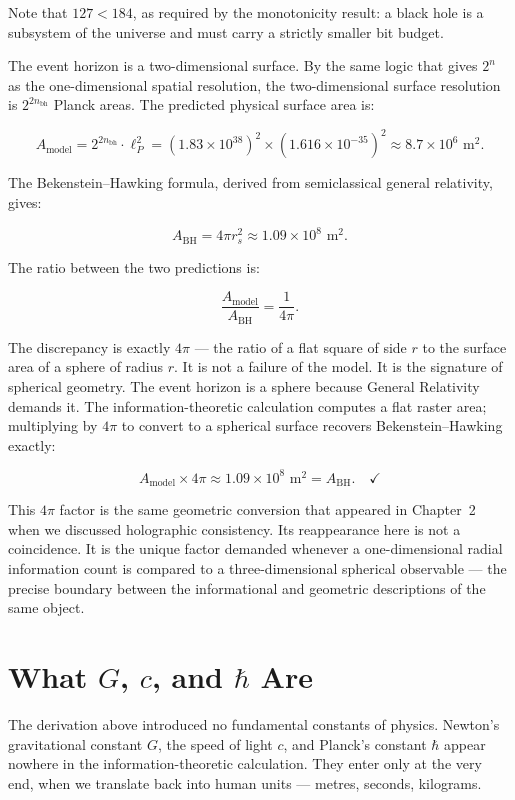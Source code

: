 Note that $127 < 184$, as required by the monotonicity result: a black hole
is a subsystem of the universe and must carry a strictly smaller bit budget.

The event horizon is a two-dimensional surface. By the same logic that gives
$2^n$ as the one-dimensional spatial resolution, the two-dimensional surface
resolution is $2^{2n_{\mathrm{bh}}}$ Planck areas. The predicted physical
surface area is:

\[
A_{\mathrm{model}} = 2^{2n_{\mathrm{bh}}} \cdot \ell_P^2
= (1.83 \times 10^{38})^2 \times (1.616 \times 10^{-35})^2
\approx 8.7 \times 10^6 \text{ m}^2.
\]

The Bekenstein--Hawking formula, derived from semiclassical general
relativity, gives:

\[
A_{\mathrm{BH}} = 4\pi r_s^2 \approx 1.09 \times 10^8 \text{ m}^2.
\]

The ratio between the two predictions is:

\[
\frac{A_{\mathrm{model}}}{A_{\mathrm{BH}}} = \frac{1}{4\pi}.
\]

The discrepancy is exactly $4\pi$ --- the ratio of a flat square of side $r$
to the surface area of a sphere of radius $r$. It is not a failure of the
model. It is the signature of spherical geometry. The event horizon is a
sphere because General Relativity demands it. The information-theoretic
calculation computes a flat raster area; multiplying by $4\pi$ to convert
to a spherical surface recovers Bekenstein--Hawking exactly:

\[
A_{\mathrm{model}} \times 4\pi \approx 1.09 \times 10^8 \text{ m}^2
= A_{\mathrm{BH}}. \quad \checkmark
\]

This $4\pi$ factor is the same geometric conversion that appeared in
Chapter~2 when we discussed holographic consistency. Its reappearance here
is not a coincidence. It is the unique factor demanded whenever a
one-dimensional radial information count is compared to a
three-dimensional spherical observable --- the precise boundary between
the informational and geometric descriptions of the same object.

\section{What $G$, $c$, and $\hbar$ Are}

The derivation above introduced no fundamental constants of physics. Newton's
gravitational constant $G$, the speed of light $c$, and Planck's constant
$\hbar$ appear nowhere in the information-theoretic calculation. They enter
only at the very end, when we translate back into human units --- metres,
seconds, kilograms.


